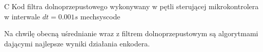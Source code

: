 	{C}
	{Kod filtra dolnoprzepustowego wykonywany w pętli sterującej mikrokontrolera w interwale $ dt = 0.001 s $}
	{mechsyscode}
		   
Na chwilę obecną uśrednianie wraz z  filtrem dolnoprzepustowym są algorytmami dającymi najlepsze wyniki działania enkodera.















